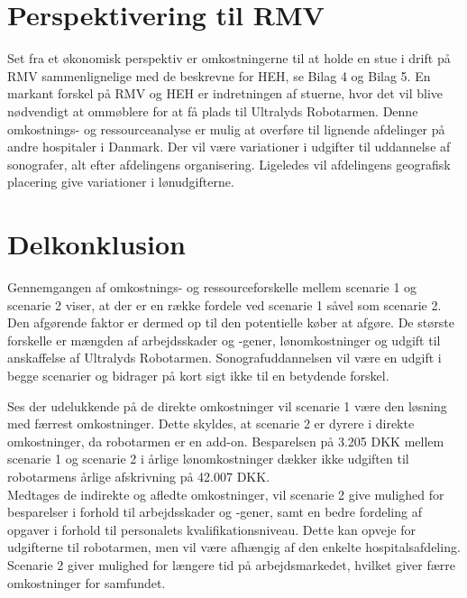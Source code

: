 \section{Perspektivering til RMV}
Set fra et økonomisk perspektiv er omkostningerne til at holde en stue i drift på RMV sammenlignelige med de beskrevne for HEH, se Bilag 4 og Bilag 5. En markant forskel på RMV og HEH er indretningen af stuerne, hvor det vil blive nødvendigt at ommøblere for at få plads til Ultralyds Robotarmen. 
Denne omkostnings- og ressourceanalyse er mulig at overføre til lignende afdelinger på andre hospitaler i Danmark. Der vil være variationer i udgifter til uddannelse af sonografer, alt efter afdelingens organisering. Ligeledes vil afdelingens geografisk placering give variationer i lønudgifterne. 

\section{Delkonklusion}
Gennemgangen af omkostnings- og ressourceforskelle mellem scenarie 1 og scenarie 2 viser, at der er en række fordele ved scenarie 1 såvel som scenarie 2. Den afgørende faktor er dermed op til den potentielle køber at afgøre. De største forskelle er mængden af arbejdsskader og -gener, lønomkostninger og udgift til anskaffelse af Ultralyds Robotarmen. Sonografuddannelsen vil være en udgift i begge scenarier og bidrager på kort sigt ikke til en betydende forskel. 

Ses der udelukkende på de direkte omkostninger vil scenarie 1 være den løsning med færrest
omkostninger. Dette skyldes, at scenarie 2 er dyrere i direkte omkostninger, da robotarmen er en
add-on. Besparelsen på 3.205 DKK mellem scenarie 1 og scenarie 2 i årlige lønomkostninger dækker ikke udgiften til robotarmens årlige afskrivning på 42.007 DKK. \\
Medtages de indirekte og afledte omkostninger, vil scenarie 2 give mulighed for besparelser i forhold til arbejdsskader og -gener, samt en bedre fordeling af opgaver i forhold til personalets kvalifikationsniveau. Dette kan opveje for udgifterne til robotarmen, men vil være afhængig af den enkelte hospitalsafdeling. Scenarie 2 giver mulighed for længere tid på arbejdsmarkedet, hvilket giver færre omkostninger for samfundet.

